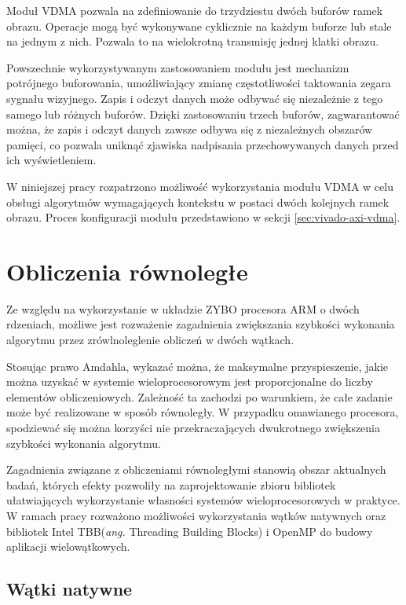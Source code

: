 Moduł VDMA pozwala na zdefiniowanie do trzydziestu dwóch buforów ramek obrazu. 
Operacje mogą być wykonywane cyklicznie na każdym buforze lub stale na jednym z nich. 
Pozwala to na wielokrotną transmisję jednej klatki obrazu.

Powszechnie wykorzystywanym zastosowaniem modułu jest mechanizm potrójnego buforowania, umożliwiający zmianę częstotliwości taktowania zegara sygnału wizyjnego. 
Zapis i odczyt danych może odbywać się niezależnie z tego samego lub różnych buforów. 
Dzięki zastosowaniu trzech buforów, zagwarantować można, że zapis i odczyt danych zawsze odbywa się z niezależnych obszarów pamięci, co pozwala uniknąć zjawiska nadpisania przechowywanych danych przed ich wyświetleniem.

W niniejszej pracy rozpatrzono możliwość wykorzystania modułu VDMA w celu obsługi algorytmów wymagających kontekstu w postaci dwóch kolejnych ramek obrazu.
Proces konfiguracji modułu przedstawiono w sekcji \ref{sec:vivado-axi-vdma}.

\section{Obliczenia równoległe}
\label{sec:openmp}

Ze względu na wykorzystanie w układzie ZYBO procesora ARM o dwóch rdzeniach, możliwe jest rozważenie zagadnienia zwiększania szybkości wykonania algorytmu przez zrówlnoleglenie obliczeń w dwóch wątkach. %

Stosując prawo Amdahla, wykazać można, że maksymalne przyspieszenie, jakie można uzyskać w systemie wieloprocesorowym jest proporcjonalne do liczby elementów obliczeniowych. 
Zależność ta zachodzi po warunkiem, że całe zadanie może być realizowane w sposób równoległy. 
W przypadku omawianego procesora, spodziewać się można korzyści nie przekraczających dwukrotnego zwiększenia szybkości wykonania algorytmu.

Zagadnienia związane z obliczeniami równoległymi stanowią obszar aktualnych badań, których efekty pozwoliły na zaprojektowanie zbioru bibliotek ułatwiających wykorzystanie własności systemów wieloprocesorowych w praktyce. 
W ramach pracy rozważono możliwości wykorzystania wątków natywnych oraz bibliotek Intel TBB(\emph{ang.} Threading Building Blocks) i OpenMP do budowy aplikacji wielowątkowych.

\subsection{Wątki natywne}

